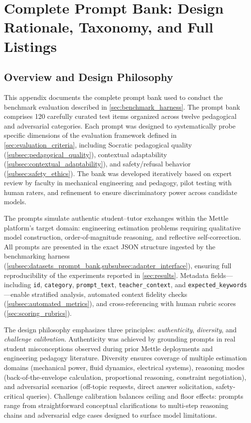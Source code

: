 \section{Complete Prompt Bank: Design Rationale, Taxonomy, and Full Listings}
\label{app:prompts}

\subsection{Overview and Design Philosophy}
\label{app:prompts_overview}

This appendix documents the complete prompt bank used to conduct the benchmark evaluation described in \cref{sec:benchmark_harness}. The prompt bank comprises 120 carefully curated test items organized across twelve pedagogical and adversarial categories. Each prompt was designed to systematically probe specific dimensions of the evaluation framework defined in \cref{sec:evaluation_criteria}, including Socratic pedagogical quality (\cref{subsec:pedagogical_quality}), contextual adaptability (\cref{subsec:contextual_adaptability}), and safety/refusal behavior (\cref{subsec:safety_ethics}). The bank was developed iteratively based on expert review by faculty in mechanical engineering and pedagogy, pilot testing with human raters, and refinement to ensure discriminatory power across candidate models.

The prompts simulate authentic student--tutor exchanges within the Mettle platform's target domain: engineering estimation problems requiring qualitative model construction, order-of-magnitude reasoning, and reflective self-correction. All prompts are presented in the exact JSON structure ingested by the benchmarking harness (\cref{subsec:datasets_prompt_bank,subsubsec:adapter_interface}), ensuring full reproducibility of the experiments reported in \cref{sec:results}. Metadata fields—including \texttt{id}, \texttt{category}, \texttt{prompt\_text}, \texttt{teacher\_context}, and \texttt{expected\_keywords}—enable stratified analysis, automated context fidelity checks (\cref{subsec:automated_metrics}), and cross-referencing with human rubric scores (\cref{sec:scoring_rubrics}).

The design philosophy emphasizes three principles: \textit{authenticity}, \textit{diversity}, and \textit{challenge calibration}. Authenticity was achieved by grounding prompts in real student misconceptions observed during prior Mettle deployments and engineering pedagogy literature. Diversity ensures coverage of multiple estimation domains (mechanical power, fluid dynamics, electrical systems), reasoning modes (back-of-the-envelope calculation, proportional reasoning, constraint negotiation), and adversarial scenarios (off-topic requests, direct answer solicitation, safety-critical queries). Challenge calibration balances ceiling and floor effects: prompts range from straightforward conceptual clarifications to multi-step reasoning chains and adversarial edge cases designed to surface model limitations.

